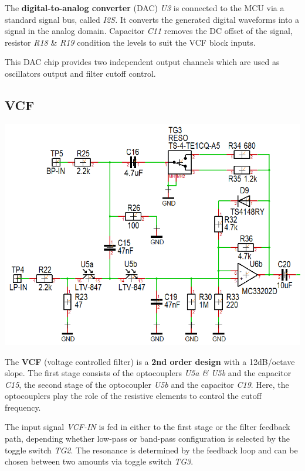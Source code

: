\documentclass{scrartcl}
\begin{document}
The \textbf{digital-to-analog converter} (DAC) \emph{U3} is connected to the MCU via a standard signal bus, called \emph{I2S.} It converts the generated digital waveforms into a signal in the analog domain. Capacitor \emph{C11} removes the DC offset of the signal, resistor \emph{R18} \& \emph{R19} condition the levels to suit the VCF block inputs.

This DAC chip provides two independent output channels which are used as oscillators output and filter cutoff control.

\subsection{VCF}

\begin{center}
    \includegraphics[scale=0.70]{assets/schema-vcf.png}
\end{center}
\vspace{0.25cm}

The \textbf{VCF} (voltage controlled filter) is a \textbf{2nd order design} with a 12dB/octave slope. The first stage consists of the optocouplers \emph{U5a \& U5b} and the capacitor \emph{C15}, the second stage of the optocoupler \emph{U5b} and the capacitor \emph{C19}. Here, the optocouplers play the role of the resistive elements to control the cutoff frequency.

The input signal \emph{VCF-IN} is fed in either to the first stage or the filter feedback path, depending whether low-pass or band-pass configuration is selected by the toggle switch \emph{TG2}. The resonance is determined by the feedback loop and can be chosen between two amounts via toggle switch \emph{TG3}.
\end{document}
